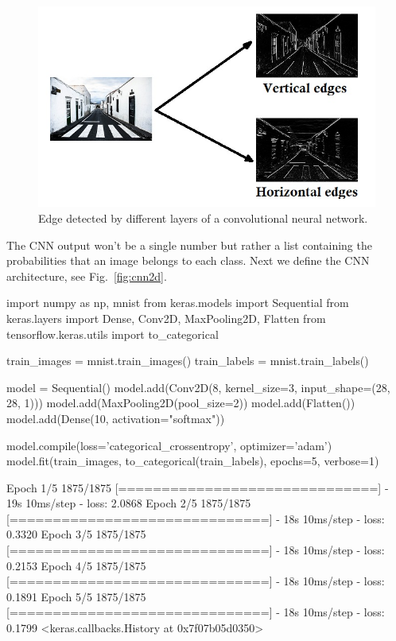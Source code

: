 \begin{figure}[htb]
\centering
\includegraphics[width=1.\textwidth]{figures/edges.jpg}
\caption{Edge detected by different layers of a convolutional neural network.}
\label{fig:conv_filters}
\end{figure}

The CNN output won't be a single number but rather a list containing the probabilities that an image belongs to each class. Next we define the CNN architecture, see Fig.~\ref{fig:cnn2d}.

\begin{ipython}
import numpy as np, mnist
from keras.models import Sequential
from keras.layers import Dense, Conv2D, MaxPooling2D, Flatten
from tensorflow.keras.utils import to_categorical

train_images = mnist.train_images() 
train_labels = mnist.train_labels() 

model = Sequential()
model.add(Conv2D(8, kernel_size=3, input_shape=(28, 28, 1)))
model.add(MaxPooling2D(pool_size=2))
model.add(Flatten())
model.add(Dense(10, activation="softmax"))

model.compile(loss='categorical_crossentropy', optimizer='adam')
model.fit(train_images, to_categorical(train_labels), epochs=5, verbose=1)
\end{ipython}
\begin{ioutput}
Epoch 1/5
1875/1875 [==============================] - 19s 10ms/step - loss: 2.0868
Epoch 2/5
1875/1875 [==============================] - 18s 10ms/step - loss: 0.3320
Epoch 3/5
1875/1875 [==============================] - 18s 10ms/step - loss: 0.2153
Epoch 4/5
1875/1875 [==============================] - 18s 10ms/step - loss: 0.1891
Epoch 5/5
1875/1875 [==============================] - 18s 10ms/step - loss: 0.1799
<keras.callbacks.History at 0x7f07b05d0350>
\end{ioutput}

